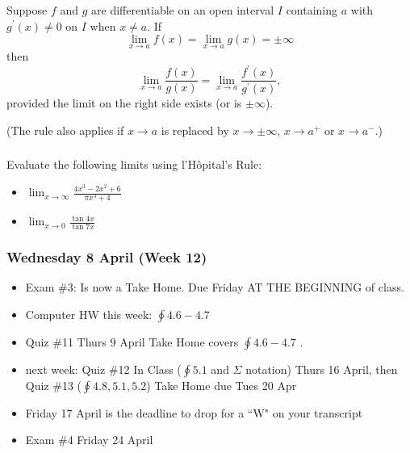 \documentclass[14pt]{beamer}
\begin{document}
\begin{frame}
\frametitle{}
\small
\begin{thm}
Suppose $f$ and $g$ are differentiable on an open interval $I$ containing $a$ with $g^{\prime}(x) \ne 0$ on $I$ when $x \ne a$.  If 
$$\lim_{x \to a} f(x)=\lim_{x \to a} g(x)=\pm\infty$$
then
$$\lim_{x \to a} \frac{f(x)}{g(x)}=\lim_{x \to a} \frac{f^{\prime}(x)}{g^{\prime}(x)},$$
provided the limit on the right side exists (or is $\pm \infty$).
\end{thm}

\vspace{1pc}
(The rule also applies if $x \to a$ is replaced by $x \to \pm \infty$, $x \to a^+$ or $x \to a^-$.)
\end{frame}

\begin{frame}%
\frametitle{}
\begin{exe} Evaluate the following limits using l'H\^{o}pital's Rule:

\begin{itemize}
\item $\displaystyle\lim_{x \to \infty} \frac{4x^3-2x^2+6}{\pi x^3+4}$

\vspace{1pc}
\item $\displaystyle\lim_{x \to 0} \frac{\tan 4x}{\tan 7x}$
\end{itemize}
\end{exe}
\end{frame}


\begin{frame}
\frametitle{Wednesday 8 April (Week 12)}
\small
\begin{itemize}
\item Exam \#3: Is now a Take Home.  Due Friday AT THE BEGINNING of class.
\item Computer HW this week: $\oint 4.6-4.7$ 	
\item Quiz \#11 Thurs 9 April Take Home covers $\oint 4.6-4.7$ .
\item next week: Quiz \#12 In Class ($\oint 5.1$ and $\Sigma$ notation) Thurs 16 April, then Quiz \#13 ($\oint 4.8, 5.1, 5.2$) Take Home due Tues 20 Apr
\item \alert{Friday 17 April is the deadline to drop for a ``W" on your transcript}
\item Exam \#4 Friday 24 April
\end{itemize}
\end{frame}
\end{document}
